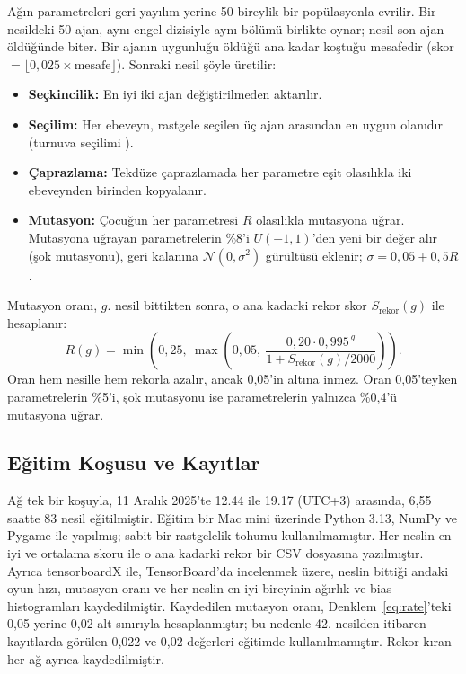 \documentclass[11pt,a4paper]{article}
\begin{document}
Ağın parametreleri geri yayılım yerine 50 bireylik bir popülasyonla evrilir. Bir nesildeki 50 ajan, aynı engel dizisiyle aynı bölümü birlikte oynar; nesil son ajan öldüğünde biter. Bir ajanın uygunluğu öldüğü ana kadar koştuğu mesafedir (skor $= \lfloor 0{,}025 \times \text{mesafe} \rfloor$). Sonraki nesil şöyle üretilir:
\begin{itemize}
  \item \textbf{Seçkincilik:} En iyi iki ajan değiştirilmeden aktarılır.
  \item \textbf{Seçilim:} Her ebeveyn, rastgele seçilen üç ajan arasından en uygun olanıdır (turnuva seçilimi \cite{goldberg1991}).
  \item \textbf{Çaprazlama:} Tekdüze çaprazlamada \cite{syswerda1989} her parametre eşit olasılıkla iki ebeveynden birinden kopyalanır.
  \item \textbf{Mutasyon:} Çocuğun her parametresi $R$ olasılıkla mutasyona uğrar. Mutasyona uğrayan parametrelerin \%8'i $U(-1, 1)$'den yeni bir değer alır (şok mutasyonu), geri kalanına $\mathcal{N}(0, \sigma^2)$ gürültüsü eklenir; $\sigma = 0{,}05 + 0{,}5R$.
\end{itemize}
Mutasyon oranı, $g$. nesil bittikten sonra, o ana kadarki rekor skor $S_{\mathrm{rekor}}(g)$ ile hesaplanır:
\begin{equation}
  R(g) = \min\!\left(0{,}25,\ \max\!\left(0{,}05,\ \frac{0{,}20\cdot 0{,}995^{\,g}}{1 + S_{\mathrm{rekor}}(g)/2000}\right)\right).
  \label{eq:rate}
\end{equation}
Oran hem nesille hem rekorla azalır, ancak 0,05'in altına inmez. Oran 0,05'teyken parametrelerin \%5'i, şok mutasyonu ise parametrelerin yalnızca \%0,4'ü mutasyona uğrar.

\subsection{Eğitim Koşusu ve Kayıtlar}

Ağ tek bir koşuyla, 11 Aralık 2025'te 12.44 ile 19.17 (UTC+3) arasında, 6,55 saatte 83 nesil eğitilmiştir. Eğitim bir Mac mini üzerinde Python 3.13, NumPy ve Pygame ile yapılmış; sabit bir rastgelelik tohumu kullanılmamıştır. Her neslin en iyi ve ortalama skoru ile o ana kadarki rekor bir CSV dosyasına yazılmıştır. Ayrıca tensorboardX \cite{tensorboardx} ile, TensorBoard'da \cite{abadi2015} incelenmek üzere, neslin bittiği andaki oyun hızı, mutasyon oranı ve her neslin en iyi bireyinin ağırlık ve bias histogramları kaydedilmiştir. Kaydedilen mutasyon oranı, Denklem~\eqref{eq:rate}'teki 0,05 yerine 0,02 alt sınırıyla hesaplanmıştır; bu nedenle 42. nesilden itibaren kayıtlarda görülen 0,022 ve 0,02 değerleri eğitimde kullanılmamıştır. Rekor kıran her ağ ayrıca kaydedilmiştir.
\end{document}
